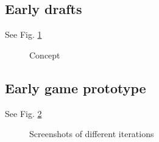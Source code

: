 \documentclass{article}
\begin{document}
\clearpage

    \subsection{Early drafts}
        See Fig. \ref{fig:concepts}
        \begin{figure}[h]
            \caption{Concept}
            \label{fig:concepts}
        \end{figure}

\clearpage

    \subsection{Early game prototype}
        See Fig. \ref{fig:prototype_screenshots}
        \begin{figure}[h]
            \caption{Screenshots of different iterations}
            \label{fig:prototype_screenshots}
        \end{figure}
\end{document}
